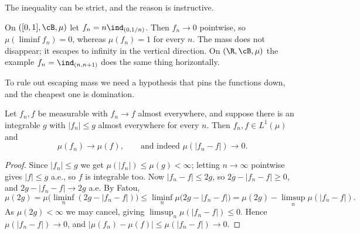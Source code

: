 The inequality can be strict, and the reason is instructive.

\begin{example}\label{pm-ex:bump}
	On $([0,1],\cB,\mu)$ let $f_n = n\ind_{(0,1/n)}$. Then $f_n \to 0$ pointwise, so $\mu(\liminf f_n) = 0$, whereas $\mu(f_n) = 1$ for every $n$. The mass does not disappear; it escapes to infinity in the vertical direction. On $(\R,\cB,\mu)$ the example $f_n = \ind_{(n,n+1)}$ does the same thing horizontally.
\end{example}

\begin{center}
\end{center}

To rule out escaping mass we need a hypothesis that pins the functions down, and the cheapest one is domination.

\begin{theorem}\label{pm-thm:dct}
	Let $f_n, f$ be measurable with $f_n \to f$ almost everywhere, and suppose there is an integrable $g$ with $|f_n| \leq g$ almost everywhere for every $n$. Then $f_n, f \in L^1(\mu)$ and
	$$
	\mu(f_n) \to \mu(f), \qquad \text{and indeed } \mu(|f_n - f|) \to 0.
	$$
\end{theorem}
\begin{proof}
	Since $|f_n| \leq g$ we get $\mu(|f_n|)\leq \mu(g) < \infty$; letting $n\to\infty$ pointwise gives $|f| \leq g$ a.e., so $f$ is integrable too. Now $|f_n - f| \leq 2g$, so $2g - |f_n - f| \geq 0$, and $2g - |f_n-f| \to 2g$ a.e. By Fatou,
	$$
	\mu(2g) = \mu\big(\liminf_n (2g - |f_n - f|)\big) \leq \liminf_n \mu\big(2g - |f_n-f|\big) = \mu(2g) - \limsup_n \mu(|f_n-f|).
	$$
	As $\mu(2g) < \infty$ we may cancel, giving $\limsup_n \mu(|f_n-f|) \leq 0$. Hence $\mu(|f_n - f|)\to 0$, and $|\mu(f_n)-\mu(f)| \leq \mu(|f_n-f|) \to 0$.
\end{proof}

